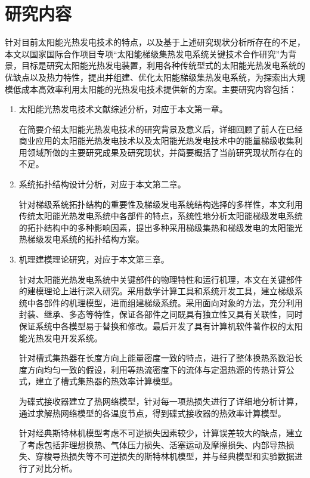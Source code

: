 \section{研究内容}
\label{sec:researchContent}

针对目前太阳能光热发电技术的特点，以及基于上述研究现状分析所存在的不足，本文以国家国际合作项目专项“太阳能梯级集热发电系统关键技术合作研究”为背景，目标是研究太阳能光热发电装置，利用各种传统型式的太阳能光热发电系统的优缺点以及热力特性，提出并组建、优化太阳能梯级集热发电系统，为探索出大规模低成本高效率利用太阳能的光热发电技术提供新的方案。主要研究内容包括：

\begin{enumerate}[label=(\arabic*)]
	
	\item 太阳能光热发电技术文献综述分析，对应于本文第一章。
	\setlength\parindent{2em}
	
	在简要介绍太阳能光热发电技术的研究背景及意义后，详细回顾了前人在已经商业应用的太阳能光热发电技术以及太阳能光热发电技术中的能量梯级收集利用领域所做的主要研究成果及研究现状，并简要概括了当前研究现状所存在的不足。
	\item 系统拓扑结构设计分析，对应于本文第二章。
	
	针对梯级系统拓扑结构的重要性及梯级发电系统结构选择的多样性，本文利用传统太阳能光热发电系统中各部件的特点，系统性地分析太阳能梯级发电系统的拓扑结构中的多种影响因素，提出多种采用梯级集热和梯级发电的太阳能光热梯级发电系统的拓扑结构方案。 

	\item 机理建模理论研究，对应于本文第三章。
	
	针对太阳能光热发电系统中关键部件的物理特性和运行机理，本文在关键部件的建模理论上进行深入研究。采用数学计算工具和系统开发工具，建立梯级系统中各部件的机理模型，进而组建梯级系统。采用面向对象的方法，充分利用封装、继承、多态等特性，保证各部件之间既具有独立性又具有关联性，同时保证系统中各模型易于替换和修改。最后开发了具有计算机软件著作权的太阳能光热发电开发系统。
	
	针对槽式集热器在长度方向上能量密度一致的特点，进行了整体换热系数沿长度方向均匀一致的假设，利用等热流密度下的流体与定温热源的传热计算公式，建立了槽式集热器的热效率计算模型。
	
	为碟式接收器建立了热网络模型，针对每一项热损失进行了详细地分析计算，通过求解热网络模型的各温度节点，得到碟式接收器的热效率计算模型。
	
	针对经典斯特林机模型考虑不可逆损失因素较少，计算误差较大的缺点，建立了考虑包括非理想换热、气体压力损失、活塞运动及摩擦损失、内部导热损失、穿梭导热损失等不可逆损失的斯特林机模型，并与经典模型和实验数据进行了对比分析。
	

\end{enumerate}
